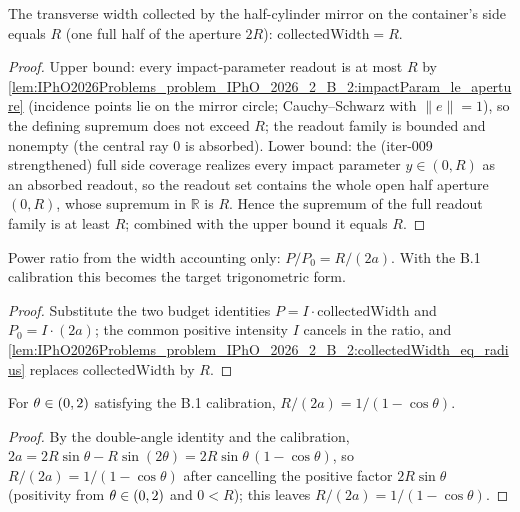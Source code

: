 \begin{lemma}
\label{lem:IPhO2026Problems_problem_IPhO_2026_2_B_2:collectedWidth_eq_radius}
The transverse width collected by the half-cylinder mirror on the
container's side equals $R$ (one full half of the aperture $2R$):
$\mathrm{collectedWidth} = R$.
\end{lemma}
\begin{proof}
Upper bound: every impact-parameter readout is at most $R$ by
\cref{lem:IPhO2026Problems_problem_IPhO_2026_2_B_2:impactParam_le_aperture}
(incidence points lie on the mirror circle; Cauchy--Schwarz with
$\|e\| = 1$), so the defining supremum does not exceed $R$; the readout
family is bounded and nonempty (the central ray $0$ is absorbed).
Lower bound: the (iter-009 strengthened) full side coverage realizes every
impact parameter $y \in (0, R)$ as an absorbed readout, so the readout
set contains the whole open half aperture $(0, R)$, whose supremum in
$\mathbb{R}$ is $R$.  Hence the supremum of the full readout family is at
least $R$; combined with the upper bound it equals $R$.
\end{proof}

\begin{lemma}
\label{lem:IPhO2026Problems_problem_IPhO_2026_2_B_2:power_ratio_eq_width_ratio}
Power ratio from the width accounting only:
$P / P_0 = R / (2a)$.  With the B.1 calibration this becomes the target
trigonometric form.
\end{lemma}
\begin{proof}
Substitute the two budget identities
$P = I \cdot \mathrm{collectedWidth}$ and $P_0 = I \cdot (2a)$; the
common positive intensity $I$ cancels in the ratio, and
\cref{lem:IPhO2026Problems_problem_IPhO_2026_2_B_2:collectedWidth_eq_radius}
replaces $\mathrm{collectedWidth}$ by $R$.
\end{proof}

\begin{lemma}
\label{lem:IPhO2026Problems_problem_IPhO_2026_2_B_2:radius_over_diameter_eq}
For $\theta \in (0, \/2)$ satisfying the B.1 calibration,
$R / (2a) = 1 / (1 - \cos\theta)$.
\end{lemma}
\begin{proof}
By the double-angle identity and the calibration,
$2a = 2R\sin\theta - R\sin(2\theta)
= 2R\sin\theta\,(1 - \cos\theta)$,
so $R/(2a) = 1/(1 - \cos\theta)$ after cancelling the positive factor
$2R\sin\theta$ (positivity from $\theta \in (0, \/2)$ and $0 < R$);
this leaves $R/(2a) = 1/(1 - \cos\theta)$.
\end{proof}

